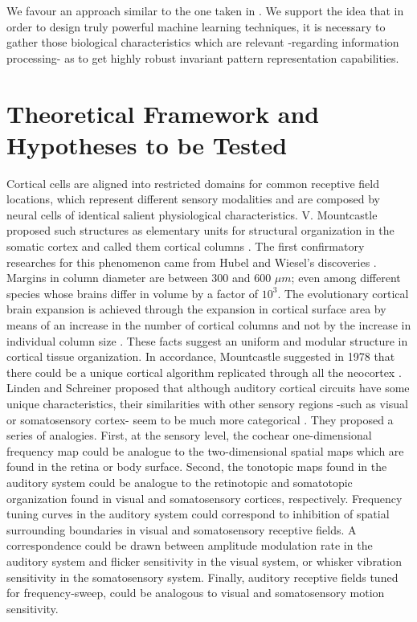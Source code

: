 \documentclass[11pt,a4paper]{article}
\begin{document}
We favour an approach similar to the one taken in \cite{hawkins_2016}.
We support the idea that in order to design truly powerful machine
learning techniques,
it is necessary to gather those biological characteristics which are
relevant -regarding information processing- as to get highly
robust invariant pattern representation capabilities. \\













\section{Theoretical Framework and Hypotheses to be Tested}

Cortical cells are aligned into restricted domains for common receptive field locations,
which represent different sensory modalities and are composed by neural cells of identical
salient physiological characteristics.
V. Mountcastle proposed such structures as elementary units for structural organization
in the somatic cortex and called them cortical columns \cite{mountcastle_1955, mountcastle_1957}.
The first confirmatory researches for this phenomenon came from Hubel and Wiesel’s
discoveries \cite{hubel_1962, hubel_1968}.
Margins in column diameter are between 300 and 600 $\mu m$; even
among different species whose brains differ in volume by a factor of $10^3$.
The evolutionary cortical brain expansion is achieved through the expansion in
cortical surface area by means of an increase in the number of cortical columns
and not by the increase in individual column size \cite{rakic_1995}.
These facts suggest an uniform and modular structure in cortical tissue organization.
In accordance, Mountcastle suggested in 1978 that there could be
a unique cortical algorithm replicated through all the neocortex
\cite{mountcastle_1978}.\\

Linden and Schreiner proposed that although auditory
cortical circuits have some unique characteristics,
their similarities with other sensory regions -such as visual or somatosensory cortex-
seem to be much more categorical \cite{linden_2003}.
They proposed a series of analogies.
First, at the sensory level, the cochear one-dimensional frequency map
could be analogue to the two-dimensional spatial maps which are found
in the retina or body surface.
Second, the tonotopic maps found in the auditory system could be analogue to the
retinotopic and somatotopic organization found in visual and somatosensory cortices,
respectively.
Frequency tuning curves in the auditory system could correspond to inhibition of
spatial surrounding boundaries in visual and somatosensory receptive fields.
A correspondence could be drawn between amplitude modulation rate
in the auditory system and flicker sensitivity in the visual system, or
whisker vibration sensitivity in the somatosensory system.
Finally, auditory receptive fields tuned for frequency-sweep, could be
analogous to visual and somatosensory motion sensitivity.\\
\end{document}
